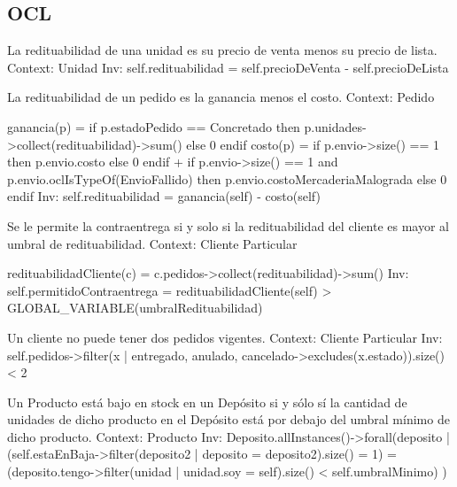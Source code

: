 \subsection{OCL}

\begin{listocl}

%
%
\begin{itemocl}{La redituabilidad de una unidad es su precio de venta menos su precio de lista.}
Context: Unidad
Inv: self.redituabilidad = self.precioDeVenta - self.precioDeLista
  \end{itemocl}


%
%
  \begin{itemocl}{La redituabilidad de un pedido es la ganancia menos el costo.}
Context: Pedido

ganancia(p) = if p.estadoPedido == Concretado
	   then p.unidades->collect(redituabilidad)->sum()
	   else 0
	   endif
costo(p) = if p.envio->size() == 1
	then p.envio.costo
	else 0
	endif
	+ if p.envio->size() == 1 and p.envio.oclIsTypeOf(EnvioFallido)
	then p.envio.costoMercaderiaMalograda
	else 0
	endif
Inv: self.redituabilidad = ganancia(self) - costo(self)
  \end{itemocl}


%
%
  \begin{itemocl}{Se le permite la contraentrega si y solo si la redituabilidad del cliente es mayor al umbral de redituabilidad.}
Context: Cliente Particular

redituabilidadCliente(c) = c.pedidos->collect(redituabilidad)->sum()
Inv: self.permitidoContraentrega = redituabilidadCliente(self) > GLOBAL_VARIABLE(umbralRedituabilidad)
  \end{itemocl}


%
%
  \begin{itemocl}{Un cliente no puede tener dos pedidos vigentes.}
Context: Cliente Particular
Inv: self.pedidos->filter(x | {entregado, anulado, cancelado}->excludes(x.estado)).size() < 2
  \end{itemocl}

%
%
  \begin{itemocl}{Un Producto está bajo en stock en un Depósito si y sólo sí la cantidad de unidades de dicho producto en el Depósito está por debajo del umbral mínimo de dicho producto.}
Context: Producto
Inv: Deposito.allInstances()->forall(deposito | 
    (self.estaEnBaja->filter(deposito2 | deposito = deposito2).size() = 1) =
    (deposito.tengo->filter(unidad | unidad.soy = self).size() < self.umbralMinimo)
)
  \end{itemocl}


\end{listocl}
